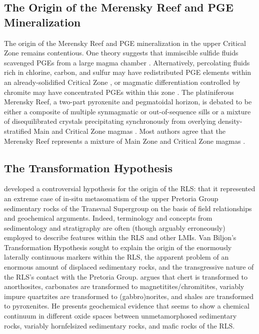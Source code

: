 \subsection{The Origin of the Merensky Reef and PGE Mineralization}
\label{sec:ch5-the-origin-of-the-merensky-reef-and-pge-mineralization}

The origin of the Merensky Reef and PGE mineralization in the upper
Critical Zone remains contentious. One theory suggests that immiscible
sulfide fluids scavenged PGEs from a large magma chamber \citep{campbell1983}. Alternatively, percolating fluids rich in chlorine, carbon,
and sulfur may have redistributed PGE elements within an
already-solidified Critical Zone \citep{boudreau1986,ballhaus1985}, or magmatic differentiation controlled by chromite may
have concentrated PGEs within this zone \citep{scoon1994}. The
platiniferous Merensky Reef, a two-part pyroxenite and pegmatoidal
horizon, is debated to be either a composite of multiple synmagmatic or
out-of-sequence sills \citep{mitchell2007,mitchell2019}
or a mixture of disequilibrated crystals precipitating synchronously
from overlying density-stratified Main and Critical Zone magmas
\citep{seabrook2005}. Most authors agree that the Merensky Reef
represents a mixture of Main Zone and Critical Zone magmas \citep{kruger1994,sharpe1985,cawthorn2015}.

\subsection{The Transformation Hypothesis}
\label{sec:ch5-the-transformation-hypothesis}

\citet{vanbiljon1949} developed a controversial hypothesis for the origin of
the RLS: that it represented an extreme case of in-situ metasomatism of
the upper Pretoria Group sedimentary rocks of the Transvaal Supergroup
on the basis of field relationships and geochemical arguments. Indeed,
terminology and concepts from sedimentology and stratigraphy are often
(though arguably erroneously) employed to describe features within the
RLS and other LMIs. Van Biljon's Transformation Hypothesis sought to
explain the origin of the enormously laterally continuous markers within
the RLS, the apparent problem of an enormous amount of displaced
sedimentary rocks, and the transgressive nature of the RLS's contact
with the Pretoria Group. \citet{vanbiljon1949} argues that chert is
transformed to anorthosites, carbonates are transformed to
magnetitites/chromitites, variably impure quartzites are transformed to
(gabbro)norites, and shales are transformed to pyroxenites. He presents
geochemical evidence that seems to show a chemical continuum in
different oxide spaces between unmetamorphosed sedimentary rocks,
variably hornfelsized sedimentary rocks, and mafic rocks of the RLS.

